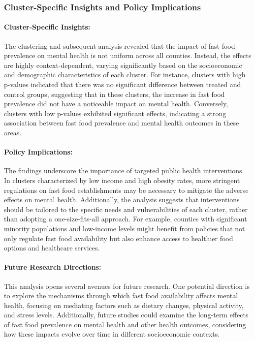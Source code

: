 \documentclass[letterpaper, 11pt]{report}
\begin{document}
\subsubsection{Cluster-Specific Insights and Policy Implications}
\paragraph{Cluster-Specific Insights:}
The clustering and subsequent analysis revealed that the impact of fast food prevalence on mental health is not uniform across all counties. Instead, the effects are highly context-dependent, varying significantly based on the socioeconomic and demographic characteristics of each cluster. For instance, clusters with high p-values indicated that there was no significant difference between treated and control groups, suggesting that in these clusters, the increase in fast food prevalence did not have a noticeable impact on mental health. Conversely, clusters with low p-values exhibited significant effects, indicating a strong association between fast food prevalence and mental health outcomes in these areas.

\paragraph{Policy Implications:}
The findings underscore the importance of targeted public health interventions. In clusters characterized by low income and high obesity rates, more stringent regulations on fast food establishments may be necessary to mitigate the adverse effects on mental health. Additionally, the analysis suggests that interventions should be tailored to the specific needs and vulnerabilities of each cluster, rather than adopting a one-size-fits-all approach. For example, counties with significant minority populations and low-income levels might benefit from policies that not only regulate fast food availability but also enhance access to healthier food options and healthcare services.

\paragraph{Future Research Directions:}
This analysis opens several avenues for future research. One potential direction is to explore the mechanisms through which fast food availability affects mental health, focusing on mediating factors such as dietary changes, physical activity, and stress levels. Additionally, future studies could examine the long-term effects of fast food prevalence on mental health and other health outcomes, considering how these impacts evolve over time in different socioeconomic contexts.
\end{document}
